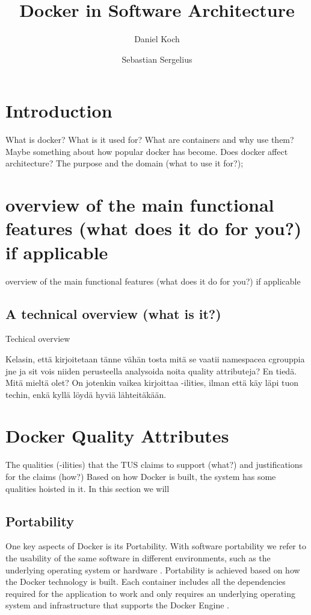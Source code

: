 \documentclass[fleqn,12pt]{olplainarticle}
\title{Docker in Software Architecture}
\author[1]{Daniel Koch}
\author[2]{Sebastian Sergelius}
\affil[1]{Address of first author}
\affil[2]{github.com/sebazai}
\begin{document}
\flushbottom
\maketitle
\thispagestyle{empty}

\section*{Introduction}

What is docker? What is it used for? What are containers and why use them? Maybe something about how popular docker has become. Does docker affect architecture?
The purpose and the domain (what to use it for?);

\section*{overview of the main functional features (what does it do for you?) if applicable}
\label{sec:examples}
 overview of the main functional features (what does it do for you?) if applicable

\subsection*{A technical overview (what is it?)}

Techical overview

Kelasin, että kirjoitetaan tänne vähän tosta mitä se vaatii namespacea cgrouppia jne ja sit vois niiden perusteella analysoida noita quality attributeja? En tiedä. Mitä mieltä olet? On jotenkin vaikea kirjoittaa -ilities, ilman että käy läpi tuon techin, enkä kyllä löydä hyviä lähteitäkään. 

\section*{Docker Quality Attributes}

The qualities (-ilities) that the TUS claims to support (what?) and justifications for the claims (how?)
Based on how Docker is built, the system has some qualities hoisted in it. In this section we will 

\subsection*{Portability}
One key aspects of Docker is its Portability. With software portability we refer to the usability of the same software in different environments, such as the underlying operating system or hardware \citep{wiki:Software_portability}. Portability is achieved based on how the Docker technology is built. Each container includes all the dependencies required for the application to work and only requires an underlying operating system and infrastructure that supports the Docker Engine \citep{hy:DevOps_with_Docker}.
\end{document}
